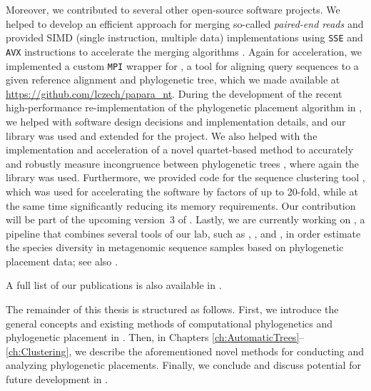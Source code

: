 Moreover, we contributed to several other open-source software projects.
We helped to develop an efficient approach for merging so-called \emph{paired-end reads}
and provided SIMD (single instruction, multiple data) implementations using \texttt{SSE} and \texttt{AVX} instructions
to accelerate the merging algorithms \cite{Flouri2017}.
Again for acceleration, we implemented a custom \texttt{\acs{MPI}} wrapper for  \cite{Berger2011a,Berger2012},
a tool for aligning query sequences to a given reference alignment and phylogenetic tree,
which we made available at \url{https://github.com/lczech/papara_nt}.
During the development of the recent high-performance re-implementation of the phylogenetic placement algorithm
in  \cite{Barbera2018}, we helped with software design decisions and implementation details,
and our  library was used and extended for the project.
We also helped with the implementation and acceleration of a novel quartet-based method to accurately and robustly
measure incongruence between phylogenetic trees \cite{Zhou2017},
where again the  library was used.
Furthermore, we provided code for the sequence clustering tool  \cite{Mahe2014,Mahe2015},
which was used for accelerating the software by factors of up to \num{20}-fold,
while at the same time significantly reducing its memory requirements.
Our contribution will be part of the upcoming version~3 of .
Lastly, we are currently working on ,
a pipeline that combines several tools of our lab, such as
 \cite{Barbera2018},  \cite{Morel2018}, and  \cite{Kapli2017},
in order estimate the species diversity in metagenomic sequence samples based on phylogenetic placement data;
see also .


A full list of our publications is also available in .

The remainder of this thesis is structured as follows.
First, we introduce the general concepts and existing methods
of computational phylogenetics and phylogenetic placement in .
Then, in Chapters \ref{ch:AutomaticTrees}--\ref{ch:Clustering}, we describe the aforementioned novel methods
for conducting and analyzing phylogenetic placements.
Finally, we conclude and discuss potential for future development in .

